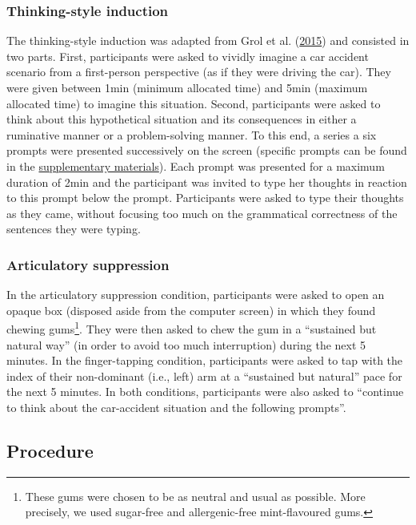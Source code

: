 \documentclass[a4paper,12pt,twoside,openright,oldfontcommands]{memoir}
\let\rmarkdownfootnote\footnote%
\def\footnote{\protect\rmarkdownfootnote}
\begin{document}
\hypertarget{thinking-style-induction}{%
\subsubsection{Thinking-style induction}\label{thinking-style-induction}}

The thinking-style induction was adapted from Grol et al. (\protect\hyperlink{ref-grol_effects_2015}{2015}) and consisted in two parts. First, participants were asked to vividly imagine a car accident scenario from a first-person perspective (as if they were driving the car). They were given between 1min (minimum allocated time) and 5min (maximum allocated time) to imagine this situation. Second, participants were asked to think about this hypothetical situation and its consequences in either a ruminative manner or a problem-solving manner. To this end, a series a six prompts were presented successively on the screen (specific prompts can be found in the \protect\hyperlink{supp}{supplementary materials}). Each prompt was presented for a maximum duration of 2min and the participant was invited to type her thoughts in reaction to this prompt below the prompt. Participants were asked to type their thoughts as they came, without focusing too much on the grammatical correctness of the sentences they were typing.

\hypertarget{articulatory-suppression}{%
\subsubsection{Articulatory suppression}\label{articulatory-suppression}}

In the articulatory suppression condition, participants were asked to open an opaque box (disposed aside from the computer screen) in which they found chewing gums\footnote{These gums were chosen to be as neutral and usual as possible. More precisely, we used sugar-free and allergenic-free mint-flavoured gums.}. They were then asked to chew the gum in a \enquote{sustained but natural way} (in order to avoid too much interruption) during the next 5 minutes. In the finger-tapping condition, participants were asked to tap with the index of their non-dominant (i.e., left) arm at a \enquote{sustained but natural} pace for the next 5 minutes. In both conditions, participants were also asked to \enquote{continue to think about the car-accident situation and the following prompts}.

\hypertarget{procedure-4}{%
\subsection{Procedure}\label{procedure-4}}
\end{document}
